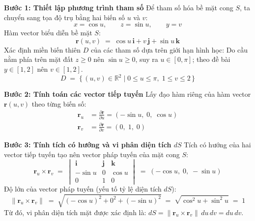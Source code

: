 \bigskip
\textbf{Bước 1: Thiết lập phương trình tham số}
Để tham số hóa bề mặt cong $S$, ta chuyển sang tọa độ trụ bằng hai biến số $u$ và $v$:
\begin{equation}
	x = \cos u, \qquad z = \sin u, \qquad y = v
\end{equation}
Hàm vector biểu diễn bề mặt $S$:
\[
\mathbf{r}(u,v) \;=\; \cos u\,\mathbf{i} + v\,\mathbf{j} + \sin u\,\mathbf{k}
\]
Xác định miền biến thiên $D$ của các tham số dựa trên giới hạn hình học: Do cầu nằm phía trên mặt đất $z \ge 0$ nên $\sin u \ge 0$, suy ra $u \in [0,\pi]$; theo đề bài $y \in [1, 2]$ nên $v \in [1, 2]$.
\[
D \;=\; \bigl\{\,(u,v) \in \mathbb{R}^2 \;\big|\; 0 \le u \le \pi,\; 1 \le v \le 2 \,\bigr\}
\]

\bigskip
\textbf{Bước 2: Tính toán các vector tiếp tuyến}
Lấy đạo hàm riêng của hàm vector $\mathbf{r}(u,v)$ theo từng biến số:
\begin{align}
	\mathbf{r}_u &= \frac{\partial \mathbf{r}}{\partial u} = (-\sin u,\; 0,\; \cos u) \\[4pt]
	\mathbf{r}_v &= \frac{\partial \mathbf{r}}{\partial v} = (0,\; 1,\; 0)
\end{align}

\bigskip
\textbf{Bước 3: Tính tích có hướng và vi phân diện tích $dS$}
Tích có hướng của hai vector tiếp tuyến tạo nên vector pháp tuyến của mặt cong $S$:
\begin{equation}
	\mathbf{r}_u \times \mathbf{r}_v \;=\;
	\begin{vmatrix}
		\mathbf{i} & \mathbf{j} & \mathbf{k} \\[2pt]
		-\sin u    & 0          & \cos u     \\[2pt]
		0          & 1          & 0
	\end{vmatrix}
	\;=\; (-\cos u,\; 0,\; -\sin u)
\end{equation}
Độ lớn của vector pháp tuyến (yếu tố tỷ lệ diện tích $dS$):
\begin{equation}
	\|\mathbf{r}_u \times \mathbf{r}_v\| \;=\; \sqrt{(-\cos u)^2 + 0^2 + (-\sin u)^2} \;=\; \sqrt{\cos^2 u + \sin^2 u} \;=\; 1
\end{equation}
Từ đó, vi phân diện tích mặt được xác định là: $dS = \|\mathbf{r}_u \times \mathbf{r}_v\|\,du\,dv = du\,dv$.

